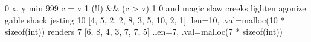 \expandafter\def\csname cpp:swap\endcsname{0}
\expandafter\def\csname cpp:PARAM(x,y)\endcsname{x, y}
\expandafter\def\csname cpp:comp\endcsname{min}
\expandafter\def\csname cpp:INIT\endcsname{999}
\expandafter\def\csname cpp:PROCESS(c,v)\endcsname{c = v}
\expandafter\def\csname cpp:NOT\endcsname{1}
\expandafter\def\csname cpp:COND(f,c,v)\endcsname{(!f) && (c > v)}
\expandafter\def\csname cpp:FALSE\endcsname{1}
\expandafter\def\csname cpp:TRUE\endcsname{0}
\expandafter\def\csname cpp:join\endcsname{and}
\expandafter\def\csname cpp:FORALLIN\endcsname{magic}
\expandafter\def\csname cpp:A\endcsname{slaw}
\expandafter\def\csname cpp:B\endcsname{creeks}
\expandafter\def\csname cpp:C\endcsname{lighten}
\expandafter\def\csname cpp:I\endcsname{agonize}
\expandafter\def\csname cpp:J\endcsname{gable}
\expandafter\def\csname cpp:F\endcsname{shack}
\expandafter\def\csname cpp:U\endcsname{jesting}
\expandafter\def\csname cpp:TABU_LEN\endcsname{10}
\expandafter\def\csname cpp:TABU_VAL\endcsname{[4, 5, 2, 2, 8, 3, 5, 10, 2, 1]}
\expandafter\def\csname cpp:TABU\endcsname{{.len=10, .val=malloc(10 * sizeof(int))}}
\expandafter\def\csname cpp:V\endcsname{renders}
\expandafter\def\csname cpp:TABV_LEN\endcsname{7}
\expandafter\def\csname cpp:TABV_VAL\endcsname{[6, 8, 4, 3, 7, 7, 5]}
\expandafter\def\csname cpp:TABV\endcsname{{.len=7, .val=malloc(7 * sizeof(int))}}

\def\C#1{\csname cpp:#1\endcsname}

